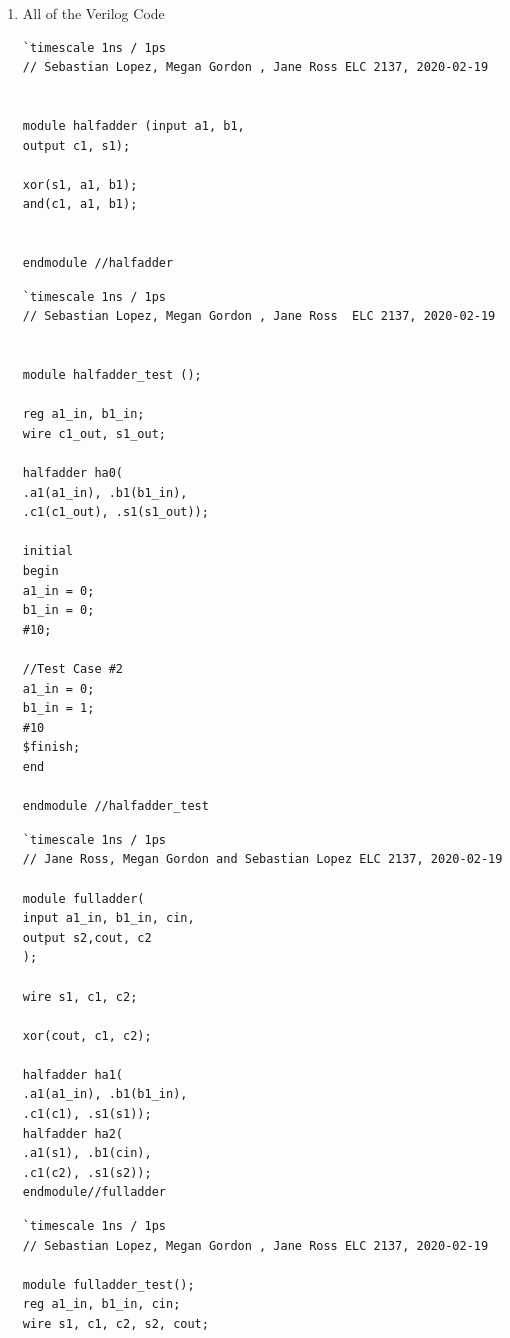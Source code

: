 \documentclass[11pt]{article}
\begin{document}
\begin{enumerate}
	\item All of the Verilog Code 
	
\begin{lstlisting}[style=Verilog,
caption=Half-adder Source Code,
label=halfadder:ex
]
`timescale 1ns / 1ps
// Sebastian Lopez, Megan Gordon , Jane Ross ELC 2137, 2020-02-19


module halfadder (input a1, b1,
output c1, s1);

xor(s1, a1, b1);
and(c1, a1, b1);


endmodule //halfadder
\end{lstlisting}

\begin{lstlisting}[style=Verilog,
caption=Half-adder Test Bench Code,
label=halfadder_test:ex
]
`timescale 1ns / 1ps
// Sebastian Lopez, Megan Gordon , Jane Ross  ELC 2137, 2020-02-19


module halfadder_test ();

reg a1_in, b1_in; 
wire c1_out, s1_out;

halfadder ha0(
.a1(a1_in), .b1(b1_in), 
.c1(c1_out), .s1(s1_out));

initial
begin
a1_in = 0;
b1_in = 0;
#10;

//Test Case #2
a1_in = 0;
b1_in = 1;
#10
$finish;
end

endmodule //halfadder_test  
\end{lstlisting}

\begin{lstlisting}[style=Verilog,
caption=Full-adder Source Code,
label=fulladder:ex
]
`timescale 1ns / 1ps
// Jane Ross, Megan Gordon and Sebastian Lopez ELC 2137, 2020-02-19

module fulladder(
input a1_in, b1_in, cin,
output s2,cout, c2
);

wire s1, c1, c2;

xor(cout, c1, c2);

halfadder ha1(
.a1(a1_in), .b1(b1_in), 
.c1(c1), .s1(s1)); 
halfadder ha2(
.a1(s1), .b1(cin), 
.c1(c2), .s1(s2));
endmodule//fulladder

\end{lstlisting}

\begin{lstlisting}[style=Verilog,
caption=Full-adder Test Bench Code,
label=fulladder_test:ex
]
`timescale 1ns / 1ps
// Sebastian Lopez, Megan Gordon , Jane Ross ELC 2137, 2020-02-19

module fulladder_test();
reg a1_in, b1_in, cin;
wire s1, c1, c2, s2, cout;


\end{lstlisting}
\end{enumerate}
\end{document}
